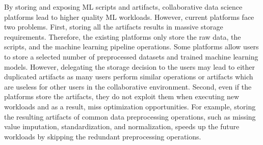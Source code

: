 By storing and exposing ML scripts and artifacts, collaborative data science platforms lead to higher quality ML workloads.
However, current platforms face two problems.
First, storing all the artifacts results in massive storage requirements.
Therefore, the existing platforms only store the raw data, the scripts, and the machine learning pipeline operations. 
Some platforms allow users to store a selected number of preprocessed datasets and trained machine learning models.
However, delegating the storage decision to the users may lead to either duplicated artifacts as many users perform similar operations or artifacts which are useless for other users in the collaborative environment.
Second, even if the platforms store the artifacts, they do not exploit them when executing new workloads and as a result, miss optimization opportunities.
For example, storing the resulting artifacts of common data preprocessing operations, such as missing value imputation, standardization, and normalization, speeds up the future workloads by skipping the redundant preprocessing operations.

